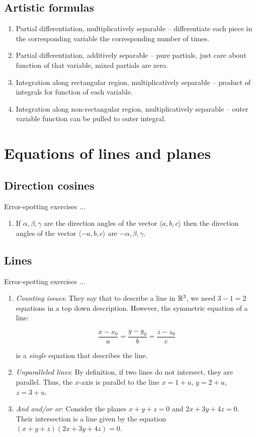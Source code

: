 \documentclass[10pt]{amsart}
\begin{document}
\subsection{Artistic formulas}

\begin{enumerate}
\item Partial differentiation, multiplicatively separable --
  differentiate each piece in the corresponding variable the
  corresponding number of times.
\item Partial differentiation, additively separable -- pure partials,
  just care about function of that variable, mixed partials are zero.
\item Integration along rectangular region, multiplicatively
  separable -- product of integrals for function of each variable.
\item Integration along non-rectangular region, multiplicatively
  separable -- outer variable function can be pulled to outer integral.
\end{enumerate}
\section{Equations of lines and planes}
\subsection{Direction cosines}

Error-spotting exercises ...

\begin{enumerate}
\item If $\alpha, \beta, \gamma$ are the direction angles of the
  vector $\langle a,b,c \rangle$ then the direction angles of the vector
  $\langle -a,b,c \rangle$ are $-\alpha, \beta, \gamma$.
\end{enumerate}

\subsection{Lines}
Error-spotting exercises ...

\begin{enumerate}
\item {\em Counting issues}: They say that to describe a line in
  $\mathbb{R}^3$, we need $3 - 1 = 2$ equations in a top down
  description. However, the symmetric equation of a line:

  $$\frac{x - x_0}{a} = \frac{y - y_0}{b} = \frac{z - z_0}{c}$$

  is a {\em single} equation that describes the line.
\item {\em Unparalleled lines}: By definition, if two lines do not
  intersect, they are parallel. Thus, the $x$-axis is parallel to the
  line $x = 1 + u$, $y = 2 + u$, $z = 3 + u$.
\item {\em And and/or or}: Consider the planes $x + y + z = 0$ and $2x
  + 3y + 4z = 0$. Their intersection is a line given by the equation
  $(x + y +z)(2x + 3y + 4z) = 0$.
\end{enumerate}
\end{document}
